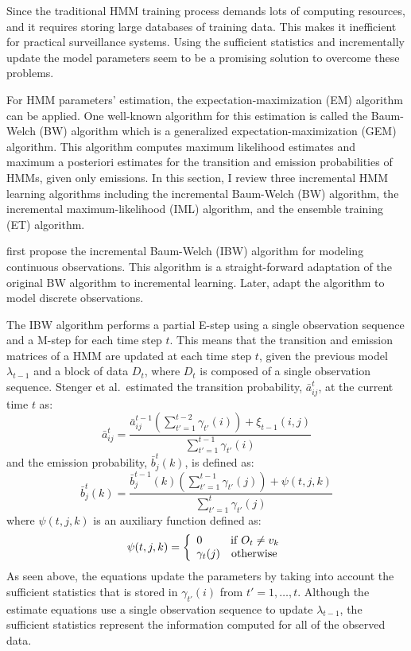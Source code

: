 Since the traditional HMM training process demands lots of computing
resources, and it requires storing large databases of training
data. This makes it inefficient for practical surveillance
systems. Using the sufficient statistics and incrementally update the
model parameters seem to be a promising solution to overcome these
problems.

For HMM parameters' estimation, the expectation-maximization (EM)
algorithm  can be applied. One well-known
algorithm for this estimation is called the Baum-Welch (BW) algorithm
which is a generalized expectation-maximization (GEM) algorithm. This
algorithm computes maximum likelihood estimates and maximum a
posteriori estimates for the transition and emission probabilities of
HMMs, given only emissions. In this section, I review three
incremental HMM learning algorithms including the incremental
Baum-Welch (BW) algorithm, the incremental maximum-likelihood (IML)
algorithm, and the ensemble training (ET) algorithm.

 first propose the incremental
Baum-Welch (IBW) algorithm for modeling continuous observations. This
algorithm is a straight-forward adaptation of the original BW
algorithm to incremental
learning. Later,  adapt the
algorithm to model discrete observations.

The IBW algorithm performs a partial E-step using a single observation
sequence and a M-step for each time step $t$. This means that the
transition and emission matrices of a HMM are updated at each time
step $t$, given the previous model $\lambda_{t-1}$ and a block of data
$D_t$, where $D_t$ is composed of a single observation
sequence. Stenger et al.\ estimated the transition probability, $\bar
a_{ij}^t$, at the current time $t$ as:
\[
  \bar a_{ij}^t  = \frac{{\bar a_{ij}^{t - 1} (\sum\limits_{t' = 1}^{t - 2} 
  {\gamma _{t'} (i)} ) + \xi _{t - 1} (i,j)}}{{\sum\limits_{t' = 1}^{t - 1} 
  {\gamma _{t'} (i)} }}
\]
and the emission probability, $\bar b_j^t(k)$, is defined as:
\[
  \bar b_j^t(k)  = \frac{{\bar b_j^{t - 1} (k)(\sum\limits_{t' = 1}^{t - 1} 
  {\gamma _{t'} (j)} ) + \psi (t,j,k)}}{{\sum\limits_{t' = 1}^t {\gamma _{t'} 
  (j)} }}
\]
where $\psi (t,j,k)$ is an auxiliary function defined as:
\[
  \psi (t,j,k) = \left\{ \begin{array}{l}
  0\quad \quad \;\;{\rm if}\;O_t  \ne v_k  \\ 
  \gamma _t (j)\quad {\rm otherwise} \\ 
  \end{array} \right.
\]
As seen above, the equations update the parameters by taking into
account the sufficient statistics that is stored in $\gamma _{t'} (i)$
from $t'=1,\ldots,t$. Although the estimate equations use a single
observation sequence to update $\lambda_{t-1}$, the sufficient
statistics represent the information computed for all of the observed
data.

